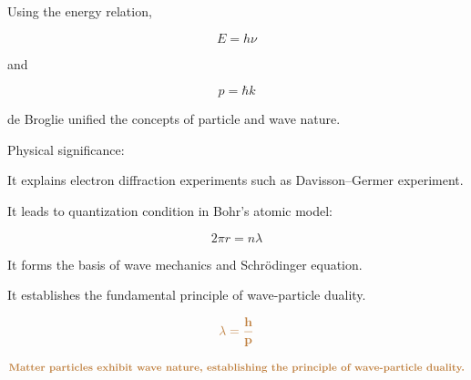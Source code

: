 \documentclass[a4paper, 12pt]{article}
\begin{document}
Using the energy relation,

\[
E = h\nu
\]

and

\[
p = \hbar k
\]

de Broglie unified the concepts of particle and wave nature.

Physical significance:

It explains electron diffraction experiments such as Davisson–Germer experiment.

It leads to quantization condition in Bohr’s atomic model:

\[
2\pi r = n\lambda
\]

It forms the basis of wave mechanics and Schrödinger equation.

It establishes the fundamental principle of wave-particle duality.

\[
\textcolor{brown}{\mathbf{\lambda = \dfrac{h}{p}}}
\]

\[
\textcolor{brown}{\textbf{Matter particles exhibit wave nature, establishing the principle of wave-particle duality.}}
\]










%
%
\end{document}
